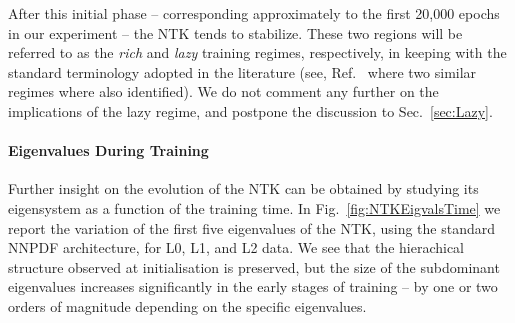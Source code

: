 After this initial phase -- corresponding approximately to the first 20,000
epochs in our experiment -- the NTK tends to stabilize. These two regions will
be referred to as the \textit{rich} and \textit{lazy} training regimes,
respectively, in keeping with the standard terminology adopted in the literature
(see, \eg Ref.~\cite{fort2020dlvk} where two similar regimes where also
identified). We do not comment any further on the implications of the lazy
regime, and postpone the discussion to Sec.~\ref{sec:Lazy}.

\FloatBarrier

\paragraph{Eigenvalues During Training}

Further insight on the evolution of the NTK can be obtained by studying its
eigensystem as a function of the training time. In Fig.~\ref{fig:NTKEigvalsTime}
we report the variation of the first five eigenvalues of the NTK, using the
standard NNPDF architecture, for L0, L1, and L2 data. We see that the
hierachical structure observed at initialisation is preserved, but the size of
the subdominant eigenvalues increases significantly in the early stages of
training -- by one or two orders of magnitude depending on the specific
eigenvalues. 


